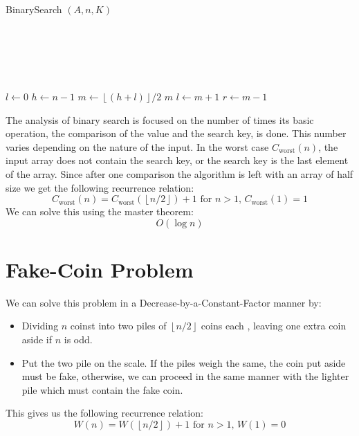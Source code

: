 \documentclass[12pt letter]{report}
\begin{document}
\begin{algorithm}[H]
  \caption{BinarySearch $ \left( A, n, K \right) $}
  \Comment{}\\
   \\
   \\
   \\
  \begin{algorithmic}[1]
    \State $l \gets 0$
    \State $h \gets n - 1$
    \State $m \gets \left\lfloor \left( h + l \right) \right\rfloor  / 2$
    \State \Return $m$
    \State $l \gets m + 1$
    \Else
    \State $r \gets m - 1$
    \EndIf
    \EndWhile
    \State {}
  \end{algorithmic}
\end{algorithm}

The analysis of binary search  is focused on the number of times its basic operation, the comparison of the value and
the search key, is done.  This number varies depending on the nature of the input. In the worst case $C_{\text{worst}}
  \left( n \right) $, the input array does not contain the search key, or the search key is the last element of the array.
Since after one comparison the algorithm is left with an array of half size we get the following recurrence relation:
\[
  C_{\text{worst}} \left( n \right) = C_{\text{worst}} \left( \left\lfloor n / 2 \right\rfloor \right) + 1 \text{ for } n
  > 1, \, C_{\text{worst}} \left( 1 \right)  = 1
\]
We can solve this using the master theorem:
\[
  O \left( \log n \right)
\]

\section{Fake-Coin Problem}


We can solve this problem in a Decrease-by-a-Constant-Factor manner by:
\begin{itemize}
  \item Dividing $n$ coinst into two piles of $\left\lfloor n / 2 \right\rfloor$ coins each , leaving one extra coin
        aside if $n$ is odd.
  \item Put the two pile on the scale. If the piles weigh the same, the coin put aside must be fake, otherwise, we can
        proceed in the same manner with the lighter pile which must contain the fake coin.
\end{itemize}
This gives us the following recurrence relation:
\[
  W \left( n \right)  = W \left( \left\lfloor n / 2 \right\rfloor \right)  + 1 \text{ for } n > 1, \, W \left( 1 \right)
  = 0
\]
\end{document}
